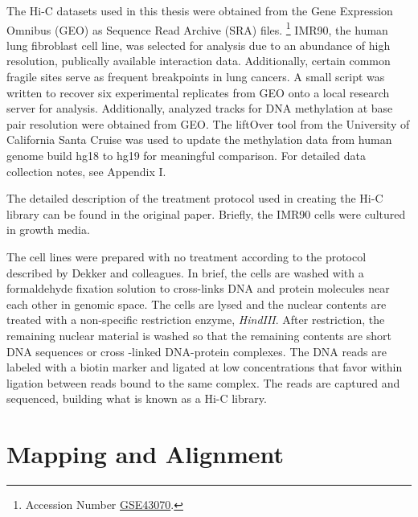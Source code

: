 \documentclass[phd,tocprelim]{cornell}
\begin{document}
The Hi-C datasets used in this thesis were obtained from the Gene
Expression Omnibus (GEO)\cite{edgar2002} as Sequence Read Archive (SRA) files.%
\footnote{Accession Number \href{http://www.ncbi.nlm.nih.gov/geo/query/acc.cgi?acc=GSE43070}{GSE43070}.}
IMR90, the human lung fibroblast cell line, was selected for analysis due to
an abundance of high resolution, publically available interaction data.
Additionally, certain common fragile sites serve as frequent breakpoints in
lung cancers\cite{tunca2002}\cite{dhillon2003}.  A small script was written to
recover six experimental replicates from GEO onto a local research server for
analysis.  Additionally, analyzed tracks for DNA methylation at base pair
resolution were obtained from GEO\cite{lister2009}.  The liftOver tool from
the University of California Santa Cruise was used to update the methylation
data from human genome build hg18 to hg19 for meaningful comparison\cite{hinrichs2006}.
For detailed data collection notes, see Appendix I.

The detailed description of the treatment protocol used in creating the Hi-C
library can be found in the original paper\cite{ren2013}.  Briefly, the IMR90
cells were cultured in growth media.

The cell lines were prepared with no treatment according to the protocol
described by Dekker and colleagues\cite{dekker2013}.  In brief, the cells
are washed with a formaldehyde fixation solution to cross-links
DNA and protein molecules near each other in genomic space.  The cells are
lysed and the nuclear contents are treated with a non-specific restriction
enzyme, \textit{HindIII}.  After restriction, the remaining nuclear material
is washed so that the remaining contents are short DNA sequences or cross
-linked DNA-protein complexes.  The DNA reads are labeled with a biotin
marker and ligated at low concentrations that favor within ligation between
reads bound to the same complex.  The reads are captured and sequenced,
building what is known as a Hi-C library.





\section{Mapping and Alignment}
\end{document}
